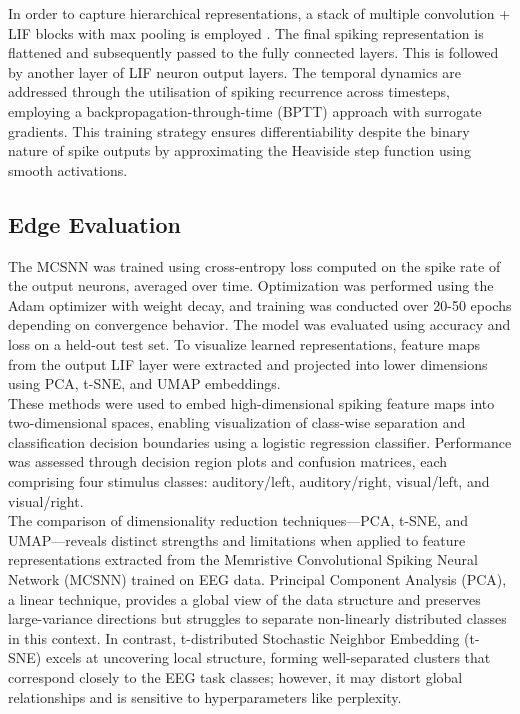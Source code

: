 \noindent In order to capture hierarchical representations, a stack of multiple convolution + LIF blocks with max pooling is employed \cite{shrestha2018slayer}. The final spiking representation is flattened and subsequently passed to the fully connected layers. This is followed by another layer of LIF neuron output layers. The temporal dynamics are addressed through the utilisation of spiking recurrence across timesteps, employing a backpropagation-through-time (BPTT) approach with surrogate gradients. This training strategy ensures differentiability despite the binary nature of spike outputs by approximating the Heaviside step function using smooth activations.

\subsection{Edge Evaluation}

The MCSNN was trained using cross-entropy loss computed on the spike rate of the output neurons, averaged over time. Optimization was performed using the Adam optimizer with weight decay, and training was conducted over 20-50 epochs depending on convergence behavior. The model was evaluated using accuracy and loss on a held-out test set. To visualize learned representations, feature maps from the output LIF layer were extracted and projected into lower dimensions using PCA, t-SNE, and UMAP embeddings.\\

\noindent These methods were used to embed high-dimensional spiking feature maps into two-dimensional spaces, enabling visualization of class-wise separation and classification decision boundaries using a logistic regression classifier. Performance was assessed through decision region plots and confusion matrices, each comprising four stimulus classes: auditory/left, auditory/right, visual/left, and visual/right.\\

\noindent The comparison of dimensionality reduction techniques—PCA, t-SNE, and UMAP—reveals distinct strengths and limitations when applied to feature representations extracted from the Memristive Convolutional Spiking Neural Network (MCSNN) trained on EEG data. Principal Component Analysis (PCA), a linear technique, provides a global view of the data structure and preserves large-variance directions but struggles to separate non-linearly distributed classes in this context. In contrast, t-distributed Stochastic Neighbor Embedding (t-SNE) excels at uncovering local structure, forming well-separated clusters that correspond closely to the EEG task classes; however, it may distort global relationships and is sensitive to hyperparameters like perplexity. \\

